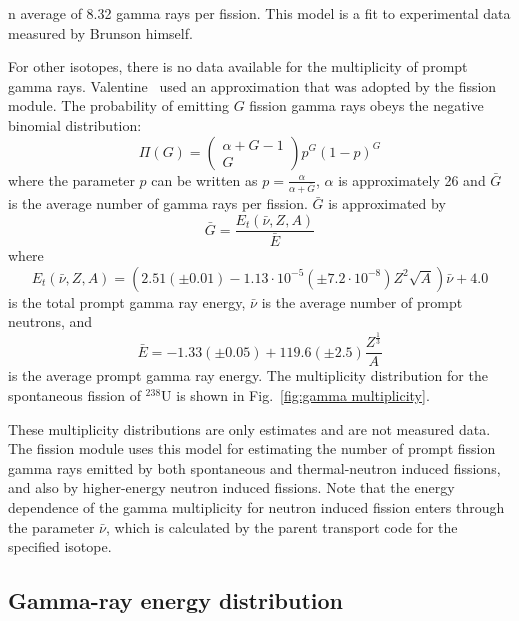 n average of 8.32 gamma rays per fission.  This model is
a fit to experimental data measured by Brunson himself.

For other isotopes, there is no data available for the multiplicity of
prompt gamma rays.  Valentine~\cite{Valentine 2001} used an
approximation that was adopted by the fission module.  The probability
of emitting $G$ fission gamma rays obeys the negative binomial
distribution:
%
\begin{equation}
\Pi(G)=\left(\begin{array}{c} \alpha+G-1 \\ G \end{array} \right) p^G(1-p)^G
\label{eq:negative binomial distribution}
\end{equation}
%
where the parameter $p$ can be written as
$p=\frac{\alpha}{\alpha+\bar{G}}$, $\alpha$ is approximately 26 and
$\bar{G}$ is the average number of gamma rays per fission.  $\bar{G}$
is approximated by
%
\begin{equation}
\bar{G} = \frac{E_t(\bar{\nu}, Z, A)}{\bar{E}}
\label{Average number of gamma-rays per fission}
\end{equation}
%
where 
%
\begin{equation}
E_t(\bar{\nu}, Z, A)=(2.51(\pm0.01)-1.13\cdot10^{-5}(\pm7.2\cdot10^{-8})Z^2\sqrt{A})\bar\nu+4.0
\label{Total fission gamma-ray energy per fission}
\end{equation}
%
is the total prompt gamma ray energy, $\bar\nu$ is the average 
number of prompt neutrons, and
%
\begin{equation}
\bar{E} = -1.33(\pm0.05)+119.6(\pm2.5)\frac{Z^{\frac{1}{3}}}{A}
\label{Average fission gamma-ray energy per fission}
\end{equation}
%
is the average prompt gamma ray energy.
The multiplicity distribution for the spontaneous fission of $^{238}$U
is shown in Fig.~\ref{fig:gamma multiplicity}.

These multiplicity distributions are only estimates and are not
measured data.  The fission module uses this model for estimating 
the number of prompt fission gamma rays emitted by both 
spontaneous and thermal-neutron induced fissions, and also by 
higher-energy neutron induced fissions. Note that the energy 
dependence of the gamma multiplicity for neutron induced fission 
enters through the parameter $\bar\nu$, which is calculated by 
the parent transport code for the specified isotope.

\subsection{Gamma-ray energy distribution}\label{sec:gamma-ray energy distribution}

